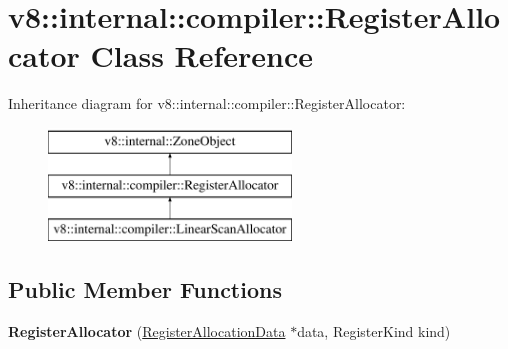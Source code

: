 \hypertarget{classv8_1_1internal_1_1compiler_1_1RegisterAllocator}{}\section{v8\+:\+:internal\+:\+:compiler\+:\+:Register\+Allocator Class Reference}
\label{classv8_1_1internal_1_1compiler_1_1RegisterAllocator}
Inheritance diagram for v8\+:\+:internal\+:\+:compiler\+:\+:Register\+Allocator\+:\begin{figure}[H]
\begin{center}
\leavevmode
\includegraphics[height=3.000000cm]{classv8_1_1internal_1_1compiler_1_1RegisterAllocator}
\end{center}
\end{figure}
\subsection*{Public Member Functions}
\begin{DoxyCompactItemize}
\item 
\mbox{\label{classv8_1_1internal_1_1compiler_1_1RegisterAllocator_a541582eca277a75f71e1a1a83e54307a}} 
{\bfseries Register\+Allocator} (\mbox{\hyperlink{classv8_1_1internal_1_1compiler_1_1RegisterAllocationData}{Register\+Allocation\+Data}} $\ast$data, Register\+Kind kind)
\end{DoxyCompactItemize}
